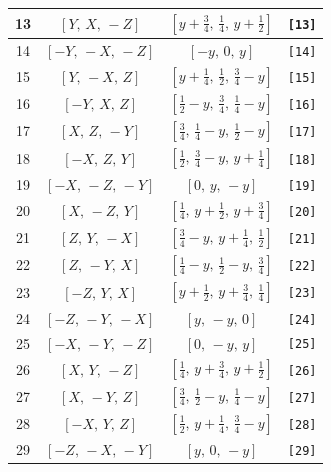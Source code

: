 \documentclass[fleqn,8pt]{jsarticle}
\begin{document}
\begin{longtable}{cccc}
13 & $\left[ Y,\, X,\, - Z \right]$ & $\left[ y + \frac{3}{4},\, \frac{1}{4},\, y + \frac{1}{2} \right]$ & {\tt [13]} \\ \hline
14 & $\left[ - Y,\, - X,\, - Z \right]$ & $\left[ - y,\, 0,\, y \right]$ & {\tt [14]} \\ \hline
15 & $\left[ Y,\, - X,\, Z \right]$ & $\left[ y + \frac{1}{4},\, \frac{1}{2},\, \frac{3}{4} - y \right]$ & {\tt [15]} \\ \hline
16 & $\left[ - Y,\, X,\, Z \right]$ & $\left[ \frac{1}{2} - y,\, \frac{3}{4},\, \frac{1}{4} - y \right]$ & {\tt [16]} \\ \hline
17 & $\left[ X,\, Z,\, - Y \right]$ & $\left[ \frac{3}{4},\, \frac{1}{4} - y,\, \frac{1}{2} - y \right]$ & {\tt [17]} \\ \hline
18 & $\left[ - X,\, Z,\, Y \right]$ & $\left[ \frac{1}{2},\, \frac{3}{4} - y,\, y + \frac{1}{4} \right]$ & {\tt [18]} \\ \hline
19 & $\left[ - X,\, - Z,\, - Y \right]$ & $\left[ 0,\, y,\, - y \right]$ & {\tt [19]} \\ \hline
20 & $\left[ X,\, - Z,\, Y \right]$ & $\left[ \frac{1}{4},\, y + \frac{1}{2},\, y + \frac{3}{4} \right]$ & {\tt [20]} \\ \hline
21 & $\left[ Z,\, Y,\, - X \right]$ & $\left[ \frac{3}{4} - y,\, y + \frac{1}{4},\, \frac{1}{2} \right]$ & {\tt [21]} \\ \hline
22 & $\left[ Z,\, - Y,\, X \right]$ & $\left[ \frac{1}{4} - y,\, \frac{1}{2} - y,\, \frac{3}{4} \right]$ & {\tt [22]} \\ \hline
23 & $\left[ - Z,\, Y,\, X \right]$ & $\left[ y + \frac{1}{2},\, y + \frac{3}{4},\, \frac{1}{4} \right]$ & {\tt [23]} \\ \hline
24 & $\left[ - Z,\, - Y,\, - X \right]$ & $\left[ y,\, - y,\, 0 \right]$ & {\tt [24]} \\ \hline
25 & $\left[ - X,\, - Y,\, - Z \right]$ & $\left[ 0,\, - y,\, y \right]$ & {\tt [25]} \\ \hline
26 & $\left[ X,\, Y,\, - Z \right]$ & $\left[ \frac{1}{4},\, y + \frac{3}{4},\, y + \frac{1}{2} \right]$ & {\tt [26]} \\ \hline
27 & $\left[ X,\, - Y,\, Z \right]$ & $\left[ \frac{3}{4},\, \frac{1}{2} - y,\, \frac{1}{4} - y \right]$ & {\tt [27]} \\ \hline
28 & $\left[ - X,\, Y,\, Z \right]$ & $\left[ \frac{1}{2},\, y + \frac{1}{4},\, \frac{3}{4} - y \right]$ & {\tt [28]} \\ \hline
29 & $\left[ - Z,\, - X,\, - Y \right]$ & $\left[ y,\, 0,\, - y \right]$ & {\tt [29]} \\ \hline

\end{longtable}
\end{document}
